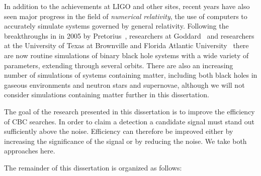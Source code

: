 In addition to the achievements at LIGO and other sites, recent years
have also seen major progress in the field of \emph{numerical
relativity}, the use of computers to accurately simulate systems
governed by general relativity.  Following the breakthroughs in in
2005 by Pretorius~\cite{Pretorius:2005gq}, researchers at
Goddard~\cite{Campanelli:2005dd} and researchers at the University of
Texas at Brownville and Florida Atlantic
University~\cite{Campanelli:2005dd} there are now routine simulations
of binary black hole systems with a wide variety of parameters,
extending through several orbits.  There are also an increasing number
of simulations of systems containing matter, including both black
holes in gaseous environments and neutron stars and supernovae,
although we will not consider simulations containing matter further in
this dissertation.


The goal of the research presented in this dissertation is to improve
the efficiency of CBC searches.  In order to claim a detection a
candidate signal must stand out sufficiently above the noise.
Efficiency can therefore be improved either by increasing the
significance of the signal or by reducing the noise.  We take both
approaches here.

The remainder of this dissertation is organized as follows:

